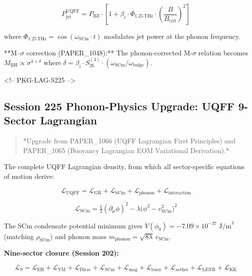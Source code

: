 \documentclass[11pt]{article}
\begin{document}
$$P_{\text{jet}}^{\text{UQFF}} = P_{\text{BZ}} \cdot \left[1 + \beta_i \cdot \Phi_{1.25\,\text{THz}} \cdot \left(\frac{B}{B_{\text{crit}}}\right)^2\right]$$

where $\Phi_{1.25\,\text{THz}} = \cos(\omega_{\text{SCm}} \cdot t)$ modulates jet power at the phonon frequency.

**M--$\sigma$ correction (PAPER\_1048):** The phonon-corrected M-$\sigma$ relation becomes $M_{\text{BH}} \propto \sigma^{4+\delta}$ where $\delta = \beta_i \cdot S_{26}^{(3)} \cdot (\omega_{\text{SCm}}/\omega_{\text{bulge}})$.

<!-- PKG-LAG-S225 -->

\subsection*{Session 225 Phonon-Physics Upgrade: UQFF 9-Sector Lagrangian}

\begin{quote}
*Upgrade from PAPER\_1066 (UQFF Lagrangian First Principles) and
PAPER\_1065 (Buoyancy Lagrangian EOM Variational Derivation).*
\end{quote}

The complete UQFF Lagrangian density, from which all sector-specific equations of motion derive:

$$\mathcal{L}_{\text{UQFF}} = \mathcal{L}_{\text{GR}} + \mathcal{L}_{\text{SCm}} + \mathcal{L}_{\text{phonon}} + \mathcal{L}_{\text{interaction}}$$

$$\mathcal{L}_{\text{SCm}} = \tfrac{1}{2}(\partial_\mu \phi)^2 - \lambda\bigl(\phi^2 - v_{\text{SCm}}^2\bigr)^2$$

The SCm condensate potential minimum gives $V(\phi_0) = -7.09 \times 10^{-37}\;\text{J/m}^3$ (matching $\rho_{\text{SCm}}$) and phonon mass $m_{\text{phonon}} = \sqrt{8\lambda}\,v_{\text{SCm}}$.

\textbf{Nine-sector closure (Session 202):}

$$\mathcal{L}_{9} = \mathcal{L}_{\text{EH}} + \mathcal{L}_{\text{YM}} + \mathcal{L}_{\text{Dirac}} + \mathcal{L}_{\text{SCm}} + \mathcal{L}_{\text{mag}} + \mathcal{L}_{\text{buoy}} + \mathcal{L}_{\text{aether}} + \mathcal{L}_{\text{LENR}} + \mathcal{L}_{\text{KK}}$$
\end{document}
